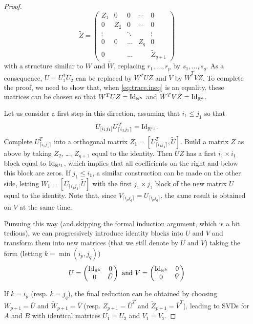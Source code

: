 \begin{proof}
\[\tilde Z = \begin{pmatrix}
Z_1 & 0 & 0 & \cdots & 0 \\
0 & Z_2 & 0 & \cdots & 0\\
\vdots &  &\ddots & &\vdots \\
0 & 0 & \ldots & Z_q & 0 \\
0 &&\ldots && \tilde Z_{q+1}
\end{pmatrix}
\]
with a structure similar to $W$ and $\tilde W$, replacing $r_1, \ldots, r_p$ by $s_1, \ldots, s_q$. As a consequence, $U = U_1^TU_2$ can be replaced by $W^TUZ$ and $V$ by $\tilde W^T V \tilde Z$. To complete the proof, we need to show that, when \cref{eq:trace.ineq} is an equality, these matrices can be chosen so that  $W^TUZ=\Id[n]$ and $\tilde W^T V \tilde Z = \Id[d]$.

Let us consider a first step in this direction, assuming that $i_1 \leq j_1$ so that 
\[
U_{[i_1j_1]} U_{\lceil i_1j_1\rceil}^T = \Id[i_1]. 
\]
Complete $U_{\lceil i_1j_1\rceil}^T$ into a orthogonal matrix $Z_1 = [U_{\lceil i_1j_1\rceil}^T, \tilde U]$. Build a matrix $Z$ as above by taking $Z_2$, \ldots, $Z_{q+1}$ equal to the identity. Then $UZ$ has a first $i_1\times i_1$ block equal to $\Id[i_1]$, which implies that all coefficients on the right and below this block are zeros. If $j_1\leq i_1$, a similar construction can be made on the other side, letting $W_1 =   [U_{\lceil i_1j_1\rceil} \tilde U]$ with the first $j_1\times j_1$ block of the new matrix $U$ equal to the identity. Note that, since $V_{\lceil i_pj_q\rceil } = U_{\lceil i_pj_q\rceil }$, the same result is obtained on $V$ at the same time. 

Pursuing this way (and skipping the formal induction argument, which is a bit tedious), we can progressively introduce identity blocks into $U$ and $V$ and transform them into new matrices (that we still denote by $U$ and $V$) taking the form (letting $k=\min(i_p, j_q)$)
\[
U = \begin{pmatrix}
\Id[k] & 0\\
0 & \bar U
\end{pmatrix}
\text{ and }
V = \begin{pmatrix}
\Id[k] & 0\\
0 & \bar V
\end{pmatrix}
\]

If $k=i_p$ (resp. $k=j_q$), the final reduction can be obtained by choosing $W_{p+1} = \bar U$ and $\tilde W_{p+1} = \bar V$ (resp.  $Z_{p+1} = \bar U^T$ and $\tilde Z_{p+1} = \bar V^T$), leading to SVDs for $A$ and $B$ with identical matrices $U_1=U_2$ and $V_1=V_2$.
\end{proof}

